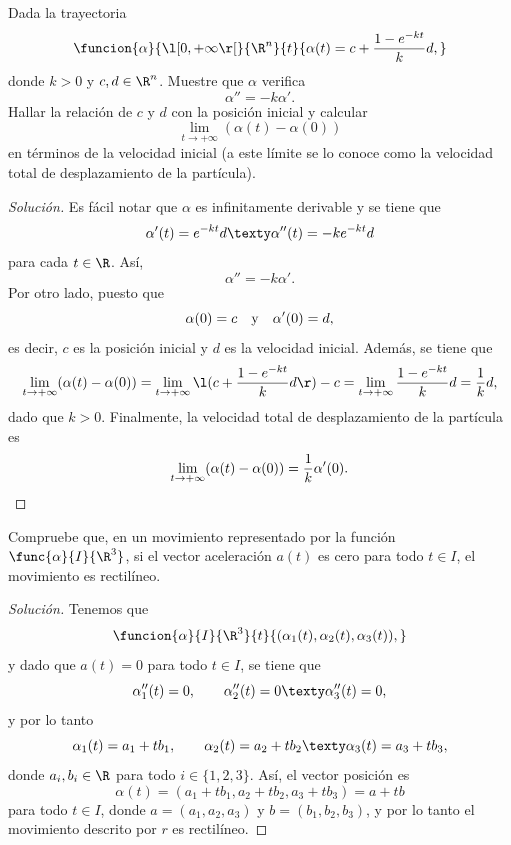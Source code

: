 \documentclass[a4,11pt]{aleph-notas}
\begin{document}
\begin{ejer}
Dada la trayectoria 
	\[	
        \funcion{\alpha}{\l[0,+\infty\r[}{\R^n}{t}{\alpha(t)=c+\dfrac{1-e^{-kt}}{k}d,}
    \]
	donde $k>0$ y $c,d\in\R^n$.	Muestre que $\alpha$ verifica
    \[
        \alpha''=-k\alpha'.
    \]
	Hallar la relación de $c$ y $d$ con la posición inicial y calcular
    \[
    	\lim_{t\to+\infty} (\alpha(t) - \alpha(0))
    \]
    en términos de la velocidad inicial (a este límite se lo conoce como la velocidad total de desplazamiento de la partícula).
\end{ejer}

\begin{proof}[Solución]
Es fácil notar que $\alpha$ es infinitamente derivable y se tiene que
	\[
		\alpha'(t)=e^{-kt}d 
		\texty
		\alpha''(t)=-ke^{-kt}d
	\]
	para cada $t\in\R$. Así,
	\[
		\alpha''=-k\alpha'.
	\]
	Por otro lado, puesto que
	\[
		\alpha(0)=c\quad \text y \quad 
		\alpha'(0)=d,
	\]
	es decir, $c$ es la posición inicial y $d$ es la velocidad inicial. Además, se tiene que
	\[
		\lim_{t\to+\infty}( \alpha(t) - \alpha(0) )
		=\lim_{t\to+\infty} \l(c+\dfrac{1-e^{-kt}}{k}d\r) - c
		=\lim_{t\to+\infty} \dfrac{1-e^{-kt}}{k}d
		=\dfrac{1}{k}d,
	\]
	dado que $k>0$. Finalmente, la velocidad total de desplazamiento de la partícula es
	\[
		\lim_{t\to+\infty}( \alpha(t) - \alpha(0) )
		=\dfrac{1}{k}\alpha'(0). \qedhere
	\]
\end{proof}

\begin{ejer}
Compruebe que, en un movimiento representado por la función $\func{\alpha}{I}{\R^3}$, si el vector aceleración $a(t)$ es cero para todo $t\in I$, el movimiento es rectilíneo.
\end{ejer}

\begin{proof}[Solución]
Tenemos que
    \[
    	\funcion{\alpha}{I}{\R^3}{t}{(\alpha_1(t),\alpha_2(t),\alpha_3(t)),}
    \]
    y dado que $a(t)=0$ para todo $t\in I$, se tiene que
    \[
        \alpha_1''(t)=0,
        \qquad
        \alpha_2''(t)=0
        \texty
        \alpha_3''(t)=0,
    \]
    y por lo tanto
    \[
        \alpha_1(t)=a_1+tb_1,
        \qquad
        \alpha_2(t)=a_2+tb_2
        \texty
        \alpha_3(t)=a_3+tb_3,
    \]
    donde $a_i,b_i\in\R$ para todo $i\in\{1,2,3\}$.
    Así, el vector posición es
    \[
        \alpha(t)=(a_1+tb_1,a_2+tb_2,a_3+tb_3)=a+tb
    \]
    para todo $t\in I$, donde $a=(a_1,a_2,a_3)$ y $b=(b_1,b_2,b_3)$, y por lo tanto el movimiento descrito por $r$ es rectilíneo.
\end{proof}
\end{document}
